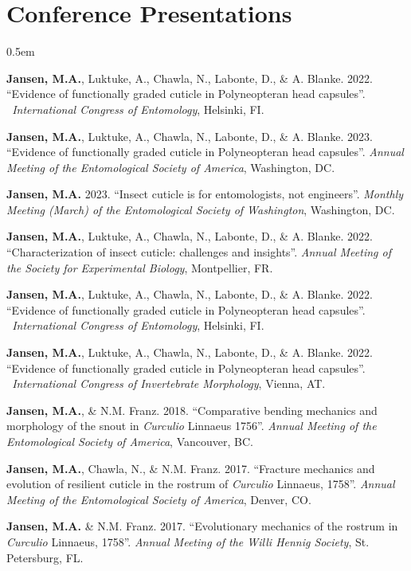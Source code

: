 \documentclass[12pt,a4paper]{article}
\begin{document}
\section*{Conference Presentations}
	\begin{description}
		\itemsep0.5em
		\item \textbf{Jansen, M.A.}, Luktuke, A., Chawla, N., Labonte, D., \& A. Blanke. 2022. ``Evidence of functionally graded cuticle	in Polyneopteran head capsules''. \textit{~International Congress of Entomology}, Helsinki, FI.
		\item \textbf{Jansen, M.A.}, Luktuke, A., Chawla, N., Labonte, D., \& A. Blanke. 2023. ``Evidence of functionally graded cuticle in Polyneopteran head capsules''. \textit{Annual Meeting of the Entomological Society of America}, Washington, DC.
		\item \textbf{Jansen, M.A.} 2023. ``Insect cuticle is for entomologists, not engineers''. \textit{Monthly Meeting (March) of the Entomological Society of Washington}, Washington, DC.
		\item \textbf{Jansen, M.A.}, Luktuke, A., Chawla, N., Labonte, D., \& A. Blanke. 2022. ``Characterization of insect cuticle: challenges and insights''. \textit{Annual Meeting of the Society for Experimental Biology}, Montpellier, FR.
		\item \textbf{Jansen, M.A.}, Luktuke, A., Chawla, N., Labonte, D., \& A. Blanke. 2022. ``Evidence of functionally graded cuticle	in Polyneopteran head capsules''. \textit{~International Congress of Entomology}, Helsinki, FI.
		\item \textbf{Jansen, M.A.}, Luktuke, A., Chawla, N., Labonte, D., \& A. Blanke. 2022. ``Evidence of functionally graded cuticle	in Polyneopteran head capsules''. \textit{~International Congress of Invertebrate Morphology}, Vienna, AT.
		\item \textbf{Jansen, M.A.}, \& N.M. Franz. 2018. ``Comparative bending mechanics and morphology of the snout in \textit{Curculio} Linnaeus 1756''. \textit{Annual Meeting of the Entomological Society of America}, Vancouver, BC.
		\item \textbf{Jansen, M.A.}, Chawla, N., \& N.M. Franz. 2017. ``Fracture mechanics and evolution of resilient cuticle in the rostrum of \textit{Curculio} Linnaeus, 1758''. \textit{Annual Meeting of the Entomological Society of America}, Denver, CO.
		\item \textbf{Jansen, M.A.} \& N.M. Franz. 2017. ``Evolutionary mechanics of the rostrum in \textit{Curculio} Linnaeus, 1758''. \textit{Annual Meeting of the Willi Hennig Society}, St. Petersburg, FL.

\end{description}
\end{document}
